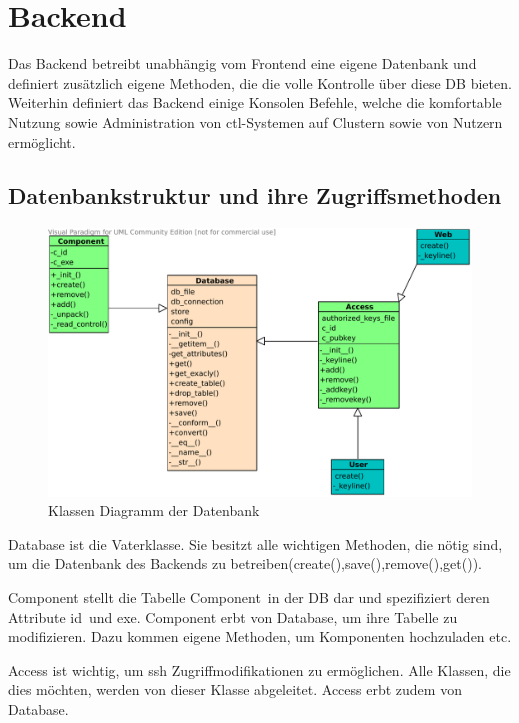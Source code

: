 \section{Backend}
Das Backend betreibt unabhängig vom Frontend eine eigene Datenbank und definiert
zusätzlich eigene Methoden, die die volle Kontrolle über diese DB bieten.
Weiterhin definiert das Backend einige Konsolen Befehle, welche die 
komfortable Nutzung sowie Administration von ctl-Systemen auf Clustern 
sowie von Nutzern ermöglicht.   
\subsection{Datenbankstruktur und ihre Zugriffsmethoden}
\begin{figure}[H]
  \begin{center}
	\includegraphics[width=\linewidth]{bilder/clsdiagrambackend.pdf}
	\caption{Klassen Diagramm der Datenbank}
	\label{g_bd_db}
  \end{center}
\end{figure}

Database ist die Vaterklasse. Sie besitzt alle wichtigen Methoden,
die nötig sind, um die Datenbank des Backends zu
betreiben(create(),save(),remove(),get()).

Component stellt die Tabelle \glqq Component\grqq\ in der DB dar und 
spezifiziert deren Attribute \glqq id\grqq\ und \grqq exe\grqq. Component 
erbt von Database, um ihre Tabelle zu modifizieren. Dazu kommen eigene 
Methoden, um Komponenten hochzuladen etc.

Access ist wichtig, um ssh Zugriffmodifikationen zu ermöglichen.
Alle Klassen, die dies möchten, werden von dieser Klasse abgeleitet.
Access erbt zudem von Database.

